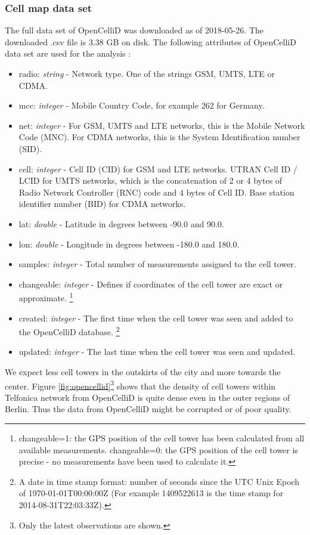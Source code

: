 \subsubsection{Cell map data set}
The full data set of OpenCelliD was downloaded as of 2018-05-26. The downloaded .csv file is 3.38 GB on disk. The following attributes of OpenCelliD data set are used for the analysis \cite{opencellid}:
\begin{itemize}
\item radio: \textit{string} - Network type. One of the strings GSM, UMTS, LTE or CDMA.
\item mcc:  \textit{integer}  -  Mobile Country Code, for example 262 for Germany.
\item net: \textit{integer} - For GSM, UMTS and LTE networks, this is the Mobile Network Code (MNC). For CDMA networks, this is the System Identification number (SID).
\item cell: \textit{integer} - Cell ID (CID) for GSM and LTE networks. UTRAN Cell ID / LCID for UMTS networks, which is the concatenation of 2 or 4 bytes of Radio Network Controller (RNC) code and 4 bytes of Cell ID. Base station identifier number (BID) for CDMA networks.
\item lat: \textit{double} - Latitude in degrees between -90.0 and 90.0.
\item lon: \textit{double} - Longitude in degrees between -180.0 and 180.0.
\item samples: \textit{integer} - Total number of measurements assigned to the cell tower.
\item changeable:  \textit{integer} - Defines if coordinates of the cell tower are exact or approximate. \footnote{changeable=1: the GPS position of the cell tower has been calculated from all available measurements. changeable=0: the GPS position of the cell tower is precise - no measurements have been used to calculate it.}
\item created: \textit{integer} - The first time when the cell tower was seen and added to the OpenCelliD database. \footnote{A date in time stamp format: number of seconds since the UTC Unix Epoch of 1970-01-01T00:00:00Z (For example 1409522613 is the time stamp for 2014-08-31T22:03:33Z).}
\item updated: \textit{integer} - The last time when the cell tower was seen and updated.
\end{itemize}

We expect less cell towers in the outskirts of the city and more towards the center. Figure \ref{fig:opencellid}\footnote{Only the latest observations are shown.} shows that the density of cell towers within Telfonica network from OpenCelliD is quite dense even in the outer regions of Berlin. Thus the data from OpenCelliD might be corrupted or of poor quality.

